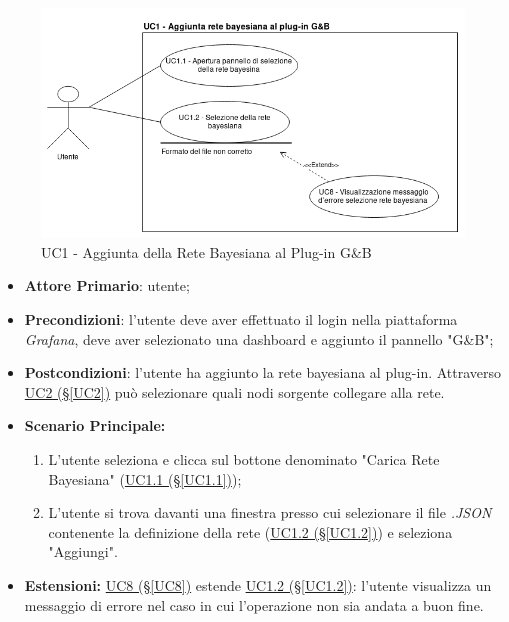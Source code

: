 \begin{figure}[H]
	\begin{center}
		\includegraphics[scale=0.5]{./images/UC1.png}
		 \caption{UC1 - Aggiunta della Rete Bayesiana al Plug-in G\&B}	
	\end{center}
\end{figure}
\begin{itemize}
	\item \textbf{Attore Primario}: utente;
	\item \textbf{Precondizioni}: l'utente deve aver effettuato il login nella piattaforma \textit{Grafana}, deve aver selezionato una dashboard e aggiunto il pannello "G\&B";
	\item \textbf{Postcondizioni}: l'utente ha aggiunto la rete bayesiana al plug-in. Attraverso \hyperref[UC2]{UC2 (§\ref*{UC2})} può selezionare quali nodi sorgente collegare alla rete.
	\item \textbf{Scenario Principale:}
	\begin{enumerate}
		\item L'utente seleziona e clicca sul bottone denominato "Carica Rete Bayesiana" (\hyperref[UC1.1]{UC1.1 (§\ref*{UC1.1})});
		\item L'utente si trova davanti una finestra presso cui selezionare il file \textit{.JSON} contenente la definizione della rete (\hyperref[UC1.2]{UC1.2 (§\ref*{UC1.2})}) e seleziona "Aggiungi".
	\end{enumerate}
	\item \textbf{Estensioni:} \hyperref[UC8]{UC8 (§\ref*{UC8})} estende \hyperref[UC1.2]{UC1.2 (§\ref*{UC1.2})}: l'utente visualizza un messaggio di errore nel caso in cui l'operazione non sia andata a buon fine.
\end{itemize}

